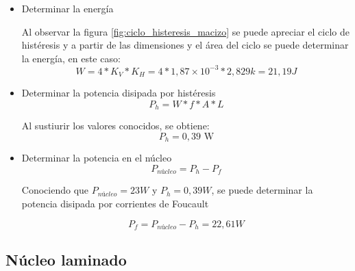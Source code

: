 \begin{itemize}
    Los demás valores son conocidos: \newline
    $N_1 = 300\ \text{ vueltas}$      \newline
    $V_s = 16\ \text{ mV}$            \newline
    $R_s = 5\ \text{ m}\Omega$         \newline
    $L = 0,3393\ \text{ m}$            \newline

    \begin{equation}
        K_H = \frac{(300 vueltas)( 16\times 10^{-3}\,\text{V})}{(5\times 10^{-3}\Omega)(0,3393\,\text{m})} = 2,829\,\text{k A/m/div}
    \end{equation}

    \item Determinar la energía
    
    Al observar la figura \ref{fig:ciclo_histeresis_macizo} se puede apreciar el ciclo de histéresis y a partir de las dimensiones y el área del ciclo se puede determinar la energía, en este caso:
    \begin{equation}
    W = 4 * K_V * K_H = 4 * 1,87 \times 10^{-3} * 2,829 k = 21,19 J
    \end{equation}

    \item Determinar la potencia disipada por histéresis
    \begin{equation}
        P_h= W * f * A * L
    \end{equation}

    Al sustiurir los valores conocidos, se obtiene:
    $$P_h = 0,39 \text{ W}$$

    \item Determinar la potencia en el núcleo
    \begin{equation}
        P_{núcleo} = P_h - P_f
    \end{equation}

    Conociendo que $P_{núcleo} = 23 W$ y $P_h = 0,39 W$, se puede determinar la potencia disipada por corrientes de Foucault

    \begin{equation}
        P_f = P_{núcleo} - P_h = 22,61 W
    \end{equation}
    
\end{itemize}
    
\vspace{1em}

\subsection{Núcleo laminado}

